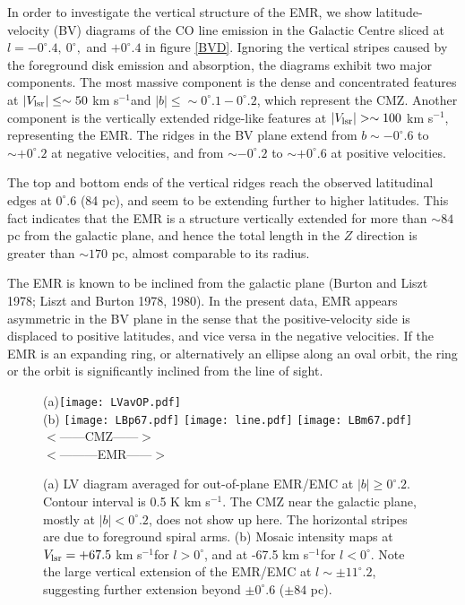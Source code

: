 \documentclass[useAMS,usenatbib]{mn2e}
\def\kms{km s$^{-1}$}
\def\vlsr{V_{\rm lsr}}
\def\deg{^\circ}\def\Deg{^\circ}
\begin{document}
In order to investigate the vertical structure of the EMR, we show latitude-velocity (BV) diagrams of the CO line emission in the Galactic Centre sliced at $l=-0\deg.4,\ 0\deg,$ and $+0\deg.4$ in figure \ref{BVD}. 
Ignoring the vertical stripes caused by the foreground disk emission and absorption, the diagrams exhibit two major components. The most massive component is the dense and concentrated features at $|\vlsr|\le \sim 50$ \kms and $|b|\le \sim 0\deg.1-0\deg.2$, which represent the CMZ. Another component is the vertically extended ridge-like features at $|\vlsr|>\sim 100$ \kms, representing the EMR. The ridges in the BV plane extend from $b\sim -0\deg.6$ to $\sim +0\deg.2$ at negative velocities, and from $\sim -0\deg.2$ to $\sim +0\deg.6$ at positive velocities. 

The top and bottom ends of the vertical ridges reach the observed latitudinal edges at $0\deg.6$ (84 pc), and seem to be extending further to higher latitudes. This fact indicates that the EMR is a structure vertically extended for more than $\sim 84$ pc from the galactic plane, and hence the total length in the $Z$ direction is greater than $\sim 170$ pc, almost comparable to its radius.
 
The EMR is known to be inclined from the galactic plane (Burton and Liszt 1978; Liszt and Burton 1978, 1980). In the present data, EMR appears asymmetric in the BV plane in the sense that the positive-velocity side is displaced to positive latitudes, and vice versa in the negative velocities. If the EMR is an expanding ring, or alternatively an ellipse along an oval orbit, the ring or the orbit is significantly inclined from the line of sight. 

\begin{figure} 
\begin{center}  
(a)\texttt{[image: LVavOP.pdf]} \\ 
(b) \texttt{[image: LBp67.pdf]} 
\hskip -1.3mm
\texttt{[image: line.pdf]}   
\hskip -1.3mm
\texttt{[image: LBm67.pdf]}  \\
 \hskip 28mm $<$------CMZ------$>$\\
 \hskip 28mm $<$---------EMR------$>$\\ 
\end{center}
\caption{
(a) LV diagram averaged for out-of-plane EMR/EMC at $|b|\ge 0\deg.2$. Contour interval is 0.5 K \kms.  The CMZ near the galactic plane, mostly at $|b|<0\deg.2$, does not show up here. The horizontal stripes are due to foreground spiral arms.
(b) Mosaic intensity maps at $\vlsr=+67.5$ \kms for $l>0\deg$, and at -67.5 \kms for $l<0\deg$. Note the large vertical extension of the EMR/EMC at $l\sim \pm 11\deg.2$, suggesting further extension beyond $\pm 0\deg.6$ ($\pm 84$ pc).  
}
 \label{LVandLB}  
\end{figure} 
\end{document}
